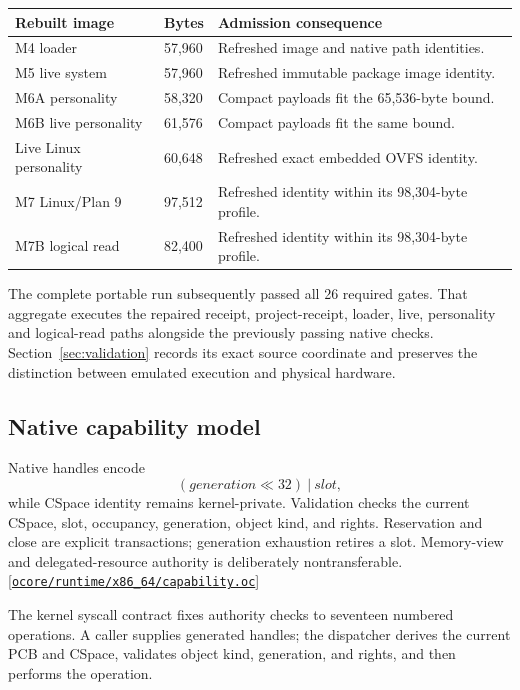 \documentclass[11pt,oneside]{article}
\newcommand{\src}[1]{\textcolor{OSlate}{\scriptsize[\href{https://github.com/lostadi/OSTADIX/blob/c0b02c326b2329a95ba52447c7180bc93957cd57/#1}{\nolinkurl{#1}}]}\allowbreak}
\begin{document}
\begin{longtable}{P{0.30\textwidth} P{0.18\textwidth} P{0.44\textwidth}}
\toprule
\textbf{Rebuilt image} & \textbf{Bytes} & \textbf{Admission consequence} \\
\midrule
\endhead
M4 loader & 57,960 & Refreshed image and native path identities. \\
M5 live system & 57,960 & Refreshed immutable package image identity. \\
M6A personality & 58,320 & Compact payloads fit the 65,536-byte bound. \\
M6B live personality & 61,576 & Compact payloads fit the same bound. \\
Live Linux personality & 60,648 & Refreshed exact embedded OVFS identity. \\
M7 Linux/Plan 9 & 97,512 & Refreshed identity within its 98,304-byte profile. \\
M7B logical read & 82,400 & Refreshed identity within its 98,304-byte profile. \\
\bottomrule
\end{longtable}

The complete portable run subsequently passed all 26 required gates. That
aggregate executes the repaired receipt, project-receipt, loader, live,
personality and logical-read paths alongside the previously passing native
checks. Section~\ref{sec:validation} records its exact source coordinate and
preserves the distinction between emulated execution and physical hardware.

\subsection{Native capability model}

Native handles encode
\[
(\textit{generation} \ll 32)\ |\ \textit{slot},
\]
while CSpace identity remains kernel-private. Validation checks the current
CSpace, slot, occupancy, generation, object kind, and rights. Reservation
and close are explicit transactions; generation exhaustion retires a slot.
Memory-view and delegated-resource authority is deliberately nontransferable.
\src{ocore/runtime/x86_64/capability.oc}

The kernel syscall contract fixes authority checks to seventeen numbered
operations. A caller supplies generated handles; the dispatcher derives the
current PCB and CSpace, validates object kind, generation, and rights, and then
performs the operation.
\end{document}

